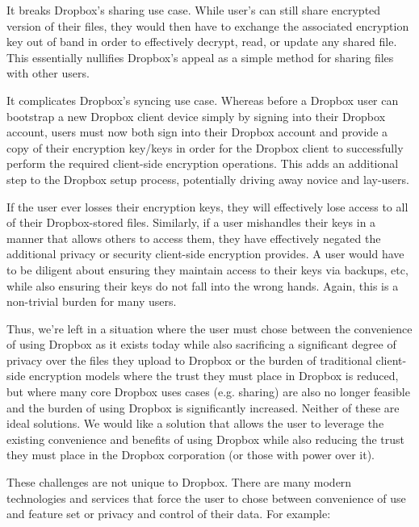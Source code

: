 \begin{packed_enum}
\item It breaks Dropbox's sharing use case. While user's can still
  share encrypted version of their files, they would then have to
  exchange the associated encryption key out of band in order to
  effectively decrypt, read, or update any shared file. This
  essentially nullifies Dropbox's appeal as a simple method for
  sharing files with other users.
\item It complicates Dropbox's syncing use case. Whereas before a
  Dropbox user can bootstrap a new Dropbox client device simply by
  signing into their Dropbox account, users must now both sign into
  their Dropbox account and provide a copy of their encryption
  key/keys in order for the Dropbox client to successfully perform the
  required client-side encryption operations. This adds an additional
  step to the Dropbox setup process, potentially driving away novice
  and lay-users.
\item If the user ever losses their encryption keys, they will
  effectively lose access to all of their Dropbox-stored
  files. Similarly, if a user mishandles their keys in a manner that
  allows others to access them, they have effectively negated the
  additional privacy or security client-side encryption provides. A
  user would have to be diligent about ensuring they maintain access
  to their keys via backups, etc, while also ensuring their keys do
  not fall into the wrong hands. Again, this is a non-trivial burden
  for many users.
\end{packed_enum}

Thus, we're left in a situation where the user must chose between the
convenience of using Dropbox as it exists today while also sacrificing
a significant degree of privacy over the files they upload to Dropbox
or the burden of traditional client-side encryption models where the
trust they must place in Dropbox is reduced, but where many core
Dropbox uses cases (e.g. sharing) are also no longer feasible and the
burden of using Dropbox is significantly increased. Neither of these
are ideal solutions. We would like a solution that allows the user to
leverage the existing convenience and benefits of using Dropbox while
also reducing the trust they must place in the Dropbox corporation (or
those with power over it).

These challenges are not unique to Dropbox. There are many modern
technologies and services that force the user to chose between
convenience of use and feature set or privacy and control of their
data. For example:

